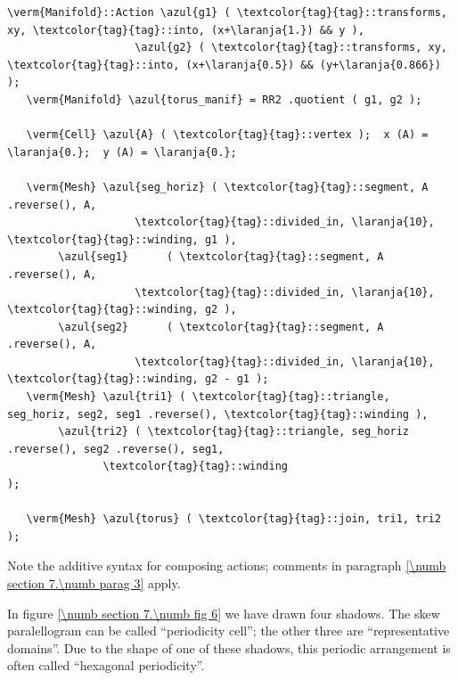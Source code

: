 \begin{Verbatim}[commandchars=\\\{\},formatcom=\small\tt,frame=single,
   label=parag-\ref{\numb section 7.\numb parag 9}.cpp,rulecolor=\color{moldura},
   baselinestretch=0.94,framesep=2mm                                            ]
   \verm{Manifold}::Action \azul{g1} ( \textcolor{tag}{tag}::transforms, xy, \textcolor{tag}{tag}::into, (x+\laranja{1.}) && y ),
                    \azul{g2} ( \textcolor{tag}{tag}::transforms, xy, \textcolor{tag}{tag}::into, (x+\laranja{0.5}) && (y+\laranja{0.866}) );
   \verm{Manifold} \azul{torus_manif} = RR2 .quotient ( g1, g2 );

   \verm{Cell} \azul{A} ( \textcolor{tag}{tag}::vertex );  x (A) = \laranja{0.};  y (A) = \laranja{0.};

   \verm{Mesh} \azul{seg_horiz} ( \textcolor{tag}{tag}::segment, A .reverse(), A,
                    \textcolor{tag}{tag}::divided_in, \laranja{10}, \textcolor{tag}{tag}::winding, g1 ),
        \azul{seg1}      ( \textcolor{tag}{tag}::segment, A .reverse(), A,
                    \textcolor{tag}{tag}::divided_in, \laranja{10}, \textcolor{tag}{tag}::winding, g2 ),
        \azul{seg2}      ( \textcolor{tag}{tag}::segment, A .reverse(), A,
                    \textcolor{tag}{tag}::divided_in, \laranja{10}, \textcolor{tag}{tag}::winding, g2 - g1 );
   \verm{Mesh} \azul{tri1} ( \textcolor{tag}{tag}::triangle, seg_horiz, seg2, seg1 .reverse(), \textcolor{tag}{tag}::winding ),
        \azul{tri2} ( \textcolor{tag}{tag}::triangle, seg_horiz .reverse(), seg2 .reverse(), seg1,
               \textcolor{tag}{tag}::winding                                               );

   \verm{Mesh} \azul{torus} ( \textcolor{tag}{tag}::join, tri1, tri2 );
\end{Verbatim}

Note the additive syntax for composing actions; comments in paragraph
\ref{\numb section 7.\numb parag 3} apply.

In figure \ref{\numb section 7.\numb fig 6} we have drawn four shadows.
The skew paralellogram can be called ``periodicity cell'';
the other three are ``representative domains''.
Due to the shape of one of these shadows, this periodic arrangement is often called
``hexagonal periodicity''.

